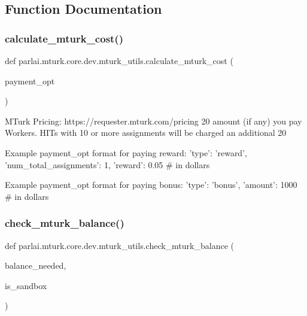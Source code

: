 \subsection{Function Documentation}
\mbox{\label{namespaceparlai_1_1mturk_1_1core_1_1dev_1_1mturk__utils_ab0dab541f46c0b18e96bcbbb536bddf6}} 
\subsubsection{\texorpdfstring{calculate\+\_\+mturk\+\_\+cost()}{calculate\_mturk\_cost()}}
{\footnotesize\ttfamily def parlai.\+mturk.\+core.\+dev.\+mturk\+\_\+utils.\+calculate\+\_\+mturk\+\_\+cost (\begin{DoxyParamCaption}\item[{}]{payment\+\_\+opt }\end{DoxyParamCaption})}

\begin{DoxyVerb}MTurk Pricing: https://requester.mturk.com/pricing 20%
amount (if any) you pay Workers. HITs with 10 or more assignments will be charged an
additional 20%

Example payment_opt format for paying reward:
{
    'type': 'reward',
    'num_total_assignments': 1,
    'reward': 0.05  # in dollars
}

Example payment_opt format for paying bonus:
{
    'type': 'bonus',
    'amount': 1000  # in dollars
}
\end{DoxyVerb}
 \mbox{\label{namespaceparlai_1_1mturk_1_1core_1_1dev_1_1mturk__utils_af89757251500a96195029eb22e58e516}} 
\subsubsection{\texorpdfstring{check\+\_\+mturk\+\_\+balance()}{check\_mturk\_balance()}}
{\footnotesize\ttfamily def parlai.\+mturk.\+core.\+dev.\+mturk\+\_\+utils.\+check\+\_\+mturk\+\_\+balance (\begin{DoxyParamCaption}\item[{}]{balance\+\_\+needed,  }\item[{}]{is\+\_\+sandbox }\end{DoxyParamCaption})}

